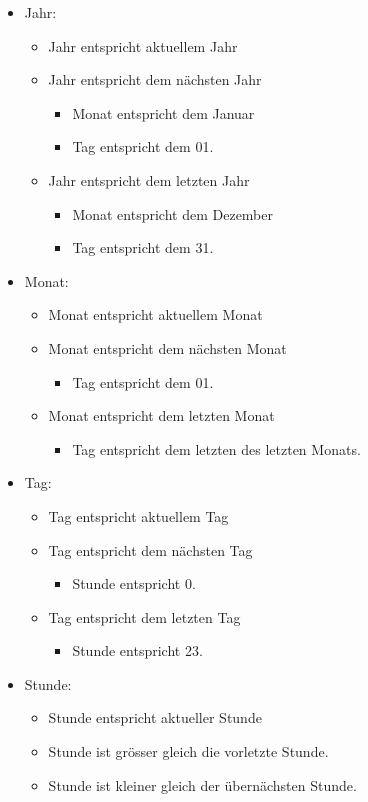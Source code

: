 \begin{itemize}
\item Jahr: 
	\begin{itemize}
		\item Jahr entspricht aktuellem Jahr
		\item Jahr entspricht dem nächsten Jahr
			\begin{itemize}
				\item Monat entspricht dem Januar
				\item Tag entspricht dem 01.
			\end{itemize}
		\item Jahr entspricht dem letzten Jahr
			\begin{itemize}
				\item Monat entspricht dem Dezember
				\item Tag entspricht dem 31.
			\end{itemize}
	\end{itemize}
\item Monat:
	\begin{itemize}
		\item Monat entspricht aktuellem Monat
		\item Monat entspricht dem nächsten Monat
			\begin{itemize}
				\item Tag entspricht dem 01.
			\end{itemize}
		\item Monat entspricht dem letzten Monat
			\begin{itemize}
				\item Tag entspricht dem letzten des letzten Monats.
			\end{itemize}
	\end{itemize}
\item Tag:
\begin{itemize}
	\item Tag entspricht aktuellem Tag
	\item Tag entspricht dem nächsten Tag
		\begin{itemize}
			\item Stunde entspricht 0.
		\end{itemize}
	\item Tag entspricht dem letzten Tag
		\begin{itemize}
			\item Stunde entspricht 23.
		\end{itemize}
\end{itemize}
\item Stunde:
	\begin{itemize}
		\item Stunde entspricht aktueller Stunde
		\item Stunde ist grösser gleich die vorletzte Stunde.
		\item Stunde ist kleiner gleich der übernächsten Stunde.
	\end{itemize}
\end{itemize}


